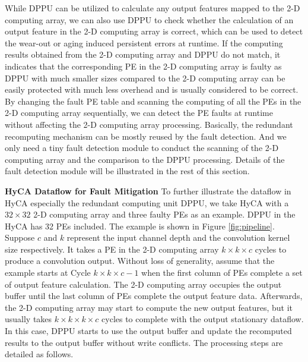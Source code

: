 While DPPU can be utilized to calculate any output features mapped to the 2-D computing array, we can also use DPPU to check whether the calculation of an output feature in the 2-D computing array is correct, which can be used to detect the wear-out or aging induced persistent errors at runtime. If the computing results obtained from the 2-D computing array and DPPU do not match, it indicates that the corresponding PE in the 2-D computing array is faulty as DPPU with much smaller sizes compared to the 2-D computing array can be easily protected with much less overhead and is usually considered to be correct. By changing the fault PE table and scanning the computing of all the PEs in the 2-D computing array sequentially, we can detect the PE faults at runtime without affecting the 2-D computing array processing. Basically, the redundant recomputing mechanism can be mostly reused by the fault detection. And we only need a tiny fault detection module to conduct the scanning of the 2-D computing array and the comparison to the DPPU processing. Details of the fault detection module will be illustrated in the rest of this section.

\textbf{HyCA Dataflow for Fault Mitigation}
To further illustrate the dataflow in HyCA especially the redundant computing unit DPPU, we take HyCA with a $32 \times 32$ 2-D computing array and three faulty PEs as an example. DPPU in the HyCA has 32 PEs included. The example is shown in Figure \ref{fig:pipeline}. Suppose $c$ and $k$ represent the input channel depth and the convolution kernel size respectively. It takes a PE in the 2-D computing array $k \times k \times c$ cycles to produce a convolution output. Without loss of generality, assume that the example starts at Cycle $k \times k \times c - 1$ when the first column of PEs complete a set of output feature calculation. The 2-D computing array occupies the output buffer until the last column of PEs complete the output feature data. Afterwards, the 2-D computing array may start to compute the new output features, but it usually takes $k \times k \times k \times c$ cycles to complete with the output stationary dataflow. In this case, DPPU starts to use the output buffer and update the recomputed results to the output buffer without write conflicts. The processing steps are detailed as follows.


